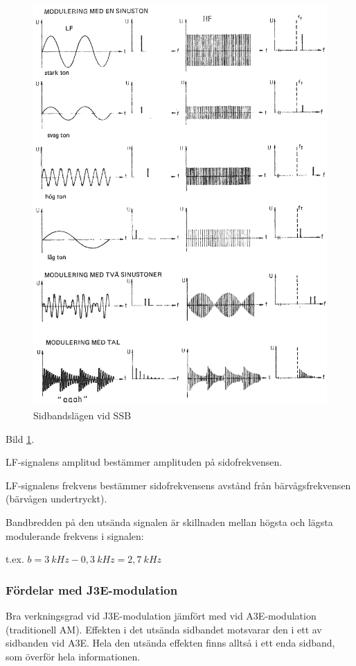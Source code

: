 \begin{figure}
\includegraphics[width=\textwidth]{images/cropped_pdfs/bild_2_1-29.pdf}
\caption{Sidbandslägen vid SSB}
\label{fig:BildII1-29}
\end{figure}

Bild \ref{fig:BildII1-29}.

LF-signalens amplitud bestämmer amplituden på sidofrekvensen.

LF-signalens frekvens bestämmer sidofrekvensens avstånd från bärvågsfrekvensen
(bärvågen undertryckt).

Bandbredden på den utsända signalen är skillnaden mellan högsta och lägsta
modulerande frekvens i signalen:

t.ex. \(b = 3~kHz - 0,3~kHz = 2,7~kHz\)

\subsubsection{Fördelar med J3E-modulation}
Bra verkningsgrad vid J3E-modulation jämfört med vid A3E-modulation
(traditionell AM). Effekten i det utsända sidbandet motsvarar den i ett av
sidbanden vid A3E. Hela den utsända effekten finns alltså i ett enda sidband,
som överför hela informationen.

